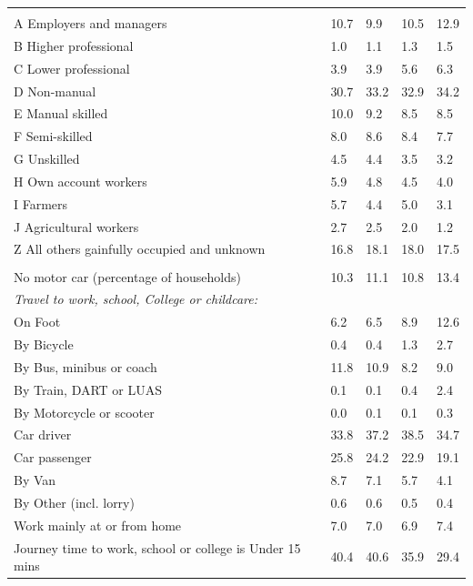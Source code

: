 \documentclass{article}
\begin{document}
\begin{table}[h]
\begin{tabular}{KTTTT}
\hline
    \\ 
    \hline
A Employers and managers & 10.7&  9.9& 10.5& 12.9\\
B Higher professional & 1.0& 1.1& 1.3& 1.5\\
C Lower professional & 3.9& 3.9& 5.6& 6.3\\
D Non-manual & 30.7& 33.2& 32.9& 34.2\\
E Manual skilled & 10.0&  9.2&  8.5&  8.5\\
F Semi-skilled & 8.0& 8.6& 8.4& 7.7\\
G Unskilled & 4.5& 4.4& 3.5& 3.2\\
H Own account workers & 5.9& 4.8& 4.5& 4.0\\
I Farmers & 5.7& 4.4& 5.0& 3.1\\
J Agricultural workers & 2.7& 2.5& 2.0& 1.2\\
Z All others gainfully occupied and unknown & 16.8& 18.1& 18.0& 17.5\\
\hline
{}\hline
    \\ 
    \hline
No motor car (percentage of households) & 10.3& 11.1& 10.8& 
13.4\\
    \hline 
\emph{Travel to work, school, College or childcare:} & & & \\
\quad On Foot &  6.2&  6.5&  8.9& 12.6\\ 
\quad By Bicycle & 0.4& 0.4& 1.3& 2.7\\ 
\quad By Bus, minibus or coach & 11.8& 10.9&  8.2&  9.0\\
\quad By Train, DART or LUAS & 0.1& 0.1& 0.4& 2.4\\
\quad By Motorcycle or scooter & 0.0& 0.1& 0.1& 0.3\\
\quad Car driver & 33.8 & 37.2& 38.5& 34.7\\
\quad Car passenger & 25.8& 24.2& 22.9& 19.1\\
\quad By Van & 8.7& 7.1& 5.7& 4.1\\
\quad By Other (incl. lorry) & 0.6& 0.6& 0.5& 0.4\\
    \hline
Work mainly at or from home & 7.0& 7.0& 6.9& 7.4\\
Journey time to work, school or college is Under 15 mins & 40.4& 40.6& 35.9& 29.4\\

\end{tabular}
\end{table}
\end{document}
